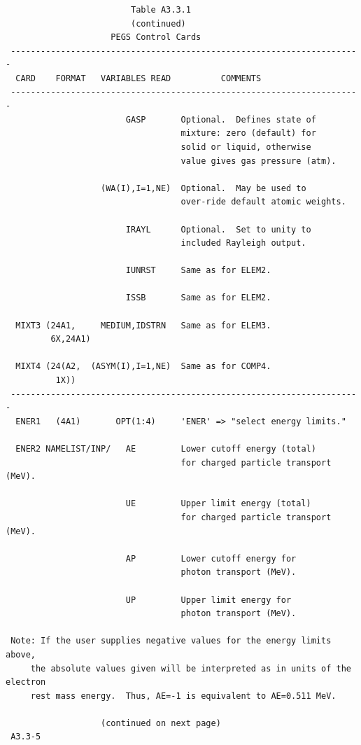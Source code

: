 \newpage {} \begin{verbatim}
                         Table A3.3.1
                         (continued)
                     PEGS Control Cards
 ----------------------------------------------------------------------
  CARD    FORMAT   VARIABLES READ          COMMENTS
 ----------------------------------------------------------------------
                        GASP       Optional.  Defines state of
                                   mixture: zero (default) for
                                   solid or liquid, otherwise
                                   value gives gas pressure (atm).

                   (WA(I),I=1,NE)  Optional.  May be used to
                                   over-ride default atomic weights.

                        IRAYL      Optional.  Set to unity to
                                   included Rayleigh output.

                        IUNRST     Same as for ELEM2.

                        ISSB       Same as for ELEM2.

  MIXT3 (24A1,     MEDIUM,IDSTRN   Same as for ELEM3.
         6X,24A1)

  MIXT4 (24(A2,  (ASYM(I),I=1,NE)  Same as for COMP4.
          1X))
 ----------------------------------------------------------------------
  ENER1   (4A1)       OPT(1:4)     'ENER' => "select energy limits."

  ENER2 NAMELIST/INP/   AE         Lower cutoff energy (total)
                                   for charged particle transport (MeV).

                        UE         Upper limit energy (total)
                                   for charged particle transport (MeV).

                        AP         Lower cutoff energy for
                                   photon transport (MeV).

                        UP         Upper limit energy for
                                   photon transport (MeV).

 Note: If the user supplies negative values for the energy limits above,
     the absolute values given will be interpreted as in units of the electron
     rest mass energy.  Thus, AE=-1 is equivalent to AE=0.511 MeV.

                   (continued on next page)
 A3.3-5
\end{verbatim}
